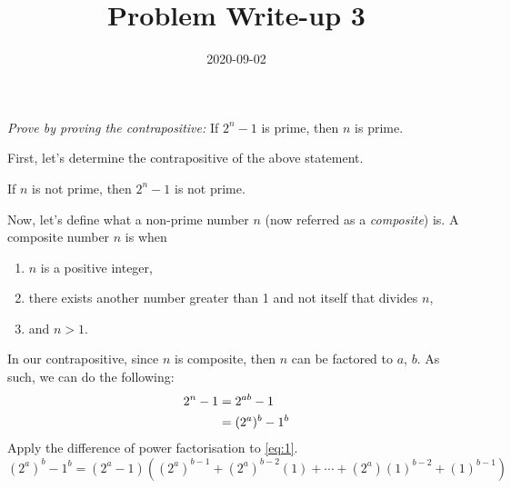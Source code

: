 \documentclass[12pt,a4paper]{article}
\title{Problem Write-up 3}
\date{2020-09-02}
\begin{document}
    \begin{problem}
        \emph{Prove by proving the contrapositive:} If \(2^n - 1\) is prime, then \(n\) is prime.
    \end{problem}
    
    \begin{answer}
        First, let's determine the contrapositive of the above statement.
        \begin{indcontrapositive}
        	If \(n\) is not prime, then \(2^n - 1\) is not prime.
        \end{indcontrapositive}
        Now, let's define what a non-prime number \(n\) (now referred as a \emph{composite}) is.
        A composite number \(n\) is when
        \begin{enumerate}
        	\item \(n\) is a positive integer,
        	\item there exists another number greater than 1 and not itself that divides \(n\),
        	\item and \(n > 1\).
    	\end{enumerate}
    	In our contrapositive, since \(n\) is composite, then \(n\) can be factored to \(a\), \(b\).
        As such, we can do the following:
        \begin{align}  \label{eq:1}
            2^n - 1 &= 2^{ab} - 1 \notag \\
            &= (2^a)^b - 1^b
        \end{align}
        Apply the difference of power factorisation to \eqref{eq:1}.
        \begin{equation} \label{eq:2}
            (2^a)^b - 1^b = (2^a - 1)((2^a)^{b - 1} + (2^a)^{b - 2} (1) + \dotsb + (2^a) (1)^{b - 2} + (1)^{b - 1})
        \end{equation}
    \end{answer}
\end{document}
